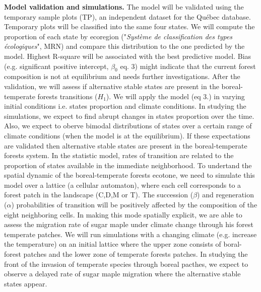 \textbf{Model validation and simulations.}  The model will be validated using
the temporary sample plots (TP), an independent dataset for the Québec
database. Temporary plots will be classified into the same four states. We
will compute the proportion of each state by ecoregion ("\textit{Système de
classification des types écologiques}", MRN) and compare this distribution to
the one predicted by the model.  Highest R-square will be associated with the
best predictive model. Bias (e.g. significant positive intercept, $\beta_0$
eq. 3) might indicate that the current forest composition is not at
equilibrium and needs further investigations.  After the validation, we will
assess if alternative stable states are present in the boreal-temperate
forests transitions ($H_1$). We will apply the model (eq 3.) in varying
initial conditions i.e. states proportion and climate conditions. In studying
the simulations, we expect to find abrupt changes in states proportion over
the time. Also, we expect to oberve bimodal distributions of states over a
certain range of climate conditions (when the model is at the equilibrium). If
these expectations are validated then alternative stable states are present in
the boreal-temperate forests system. In the statistic model, rates of
transition are related to the proportion of states available in the immediate
neighborhood. To undertand the spatial dynamic of the boreal-temperate forests
ecotone, we need to simulate this model over a lattice (a cellular automaton),
where each cell corresponds to a forest patch in the landscape (C,D,M or T).
The succession ($\beta$) and regeneration ($\alpha$) probabilities of
transition will be positively affected by the composition of the eight
neighboring cells. In making this mode spatially explicit, we are able to
assess the migration rate of sugar maple under climate change through his
forest temperate patches. We will run simulations with a changing climate
(e.g. increase the temperature) on an initial lattice where the upper zone
consists of boral-forest patches and the lower zone of temperate forests
patches. In studying the front of the invasion of temperate species through
boreal pacthes, we expect to observe a delayed rate of sugar maple migration
where the alternative stable states appear.

